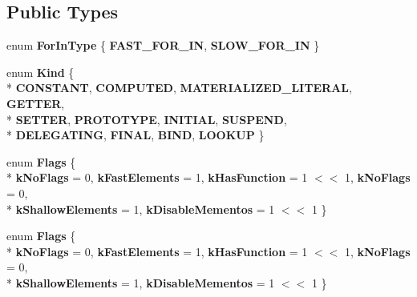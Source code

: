 \subsection*{Public Types}
\begin{DoxyCompactItemize}
\item 
\hypertarget{classv8_1_1internal_1_1_v8___f_i_n_a_l_aac0dfeef8aecddc938779330bac40083}{}enum {\bfseries For\+In\+Type} \{ {\bfseries F\+A\+S\+T\+\_\+\+F\+O\+R\+\_\+\+I\+N}, 
{\bfseries S\+L\+O\+W\+\_\+\+F\+O\+R\+\_\+\+I\+N}
 \}\label{classv8_1_1internal_1_1_v8___f_i_n_a_l_aac0dfeef8aecddc938779330bac40083}

\item 
\hypertarget{classv8_1_1internal_1_1_v8___f_i_n_a_l_ab798cb8a78cc1c893470afbceaf1e960}{}enum {\bfseries Kind} \{ \\*
{\bfseries C\+O\+N\+S\+T\+A\+N\+T}, 
{\bfseries C\+O\+M\+P\+U\+T\+E\+D}, 
{\bfseries M\+A\+T\+E\+R\+I\+A\+L\+I\+Z\+E\+D\+\_\+\+L\+I\+T\+E\+R\+A\+L}, 
{\bfseries G\+E\+T\+T\+E\+R}, 
\\*
{\bfseries S\+E\+T\+T\+E\+R}, 
{\bfseries P\+R\+O\+T\+O\+T\+Y\+P\+E}, 
{\bfseries I\+N\+I\+T\+I\+A\+L}, 
{\bfseries S\+U\+S\+P\+E\+N\+D}, 
\\*
{\bfseries D\+E\+L\+E\+G\+A\+T\+I\+N\+G}, 
{\bfseries F\+I\+N\+A\+L}, 
{\bfseries B\+I\+N\+D}, 
{\bfseries L\+O\+O\+K\+U\+P}
 \}\label{classv8_1_1internal_1_1_v8___f_i_n_a_l_ab798cb8a78cc1c893470afbceaf1e960}

\item 
\hypertarget{classv8_1_1internal_1_1_v8___f_i_n_a_l_ad3147c008d4c506aa09adef96af47fc8}{}enum {\bfseries Flags} \{ \\*
{\bfseries k\+No\+Flags} = 0, 
{\bfseries k\+Fast\+Elements} = 1, 
{\bfseries k\+Has\+Function} = 1 $<$$<$ 1, 
{\bfseries k\+No\+Flags} = 0, 
\\*
{\bfseries k\+Shallow\+Elements} = 1, 
{\bfseries k\+Disable\+Mementos} = 1 $<$$<$ 1
 \}\label{classv8_1_1internal_1_1_v8___f_i_n_a_l_ad3147c008d4c506aa09adef96af47fc8}

\item 
\hypertarget{classv8_1_1internal_1_1_v8___f_i_n_a_l_ad3147c008d4c506aa09adef96af47fc8}{}enum {\bfseries Flags} \{ \\*
{\bfseries k\+No\+Flags} = 0, 
{\bfseries k\+Fast\+Elements} = 1, 
{\bfseries k\+Has\+Function} = 1 $<$$<$ 1, 
{\bfseries k\+No\+Flags} = 0, 
\\*
{\bfseries k\+Shallow\+Elements} = 1, 
{\bfseries k\+Disable\+Mementos} = 1 $<$$<$ 1
 \}\label{classv8_1_1internal_1_1_v8___f_i_n_a_l_ad3147c008d4c506aa09adef96af47fc8}


\end{DoxyCompactItemize}
